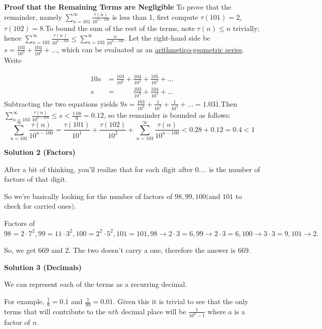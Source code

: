 \begin{enumerate}
 \textbf{Proof that the Remaining Terms are Negligible} To prove that the remainder, namely $\sum_{n=101}^\infty \frac{\tau(n)}{10^{n-100}}$ is less than 1, first compute $\tau(101) = 2$, $\tau(102)=8$.To bound the sum of the rest of the terms, note $\tau(n) \le n$ trivially; hence $\sum_{n=103}^\infty \frac{\tau(n)}{10^{n-100}} \le \sum_{n=103}^\infty \frac{n}{10^{n-100}}$. Let the right-hand side be $s = \frac{103}{10^3} + \frac{104}{10^4} + \dots$, which can be evaluated as an \href{https://artofproblemsolving.com/wiki/index.php?title=Arithmetico-geometric\_series}{arithmetico-geometric series}. Write

 \begin{align*}10s &= \frac{103}{10^2} + \frac{104}{10^3} + \frac{105}{10^4} + \dots \\[0.5em]s   &= \phantom{\frac{103}{10^2} +{}} \frac{103}{10^3} + \frac{104}{10^4} + \dots\end{align*}
Subtracting the two equations yields $9s = \frac{103}{10^2} + \frac{1}{10^3} + \frac{1}{10^4} + \dots = 1.03\overline{1}$.Then $\sum_{n=103}^\infty \frac{\tau(n)}{10^{n-100}} \le s < \frac{1.08}{9} = 0.12$, so the remainder is bounded as follows:
 \[\sum_{n=101}^\infty \frac{\tau(n)}{10^{n-100}} = \frac{\tau(101)}{10^1} + \frac{\tau(102)}{10^2} + \sum_{n=103}^\infty \frac{\tau(n)}{10^{n-100}} < 0.28 + 0.12 = 0.4 < 1\]




\textbf{Solution 2 (Factors)}

After a bit of thinking, you'll realize that for each digit after $0.\dots$ is the number of factors of that digit.

 So we're basically looking for the number of factors of $98,99,100 ($and $101$ to check for carried ones$).$

 Factors of $98 = 2\cdot7^2, 99 = 11\cdot3^2, 100 = 2^2\cdot5^2, 101 = 101, 98 \to{2\cdot3=6}, 99 \to{2\cdot3=6}, 100 \to{3\cdot3=9}, 101 \to{2}.$ 

 So, we get $669$ and $2$. The two doesn't carry a one, therefore the answer is $\boxed{669}.$




\textbf{Solution 3 (Decimals)}

We can represent each of the terms as a recurring decimal. 

 For example, $\frac{1}{9} = 0.\overline{1}$ and $\frac{1}{99} = 0.\overline{01}$. Given this it is trivial to see that the only terms that will contribute to the $nth$ decimal place will be $\frac{1}{10^a - 1}$ where $a$ is a factor of $n$. 


\end{enumerate}
